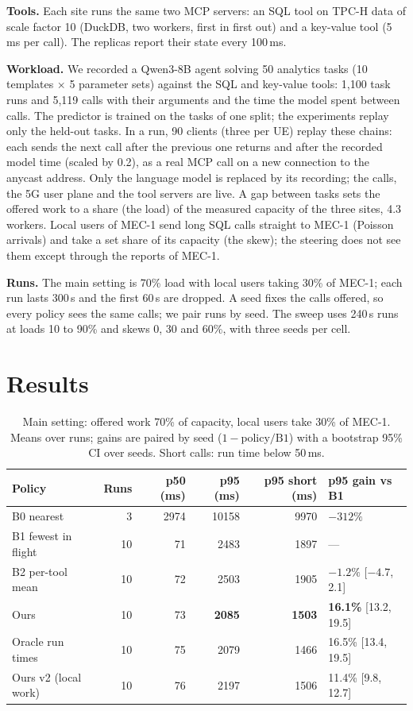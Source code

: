 \documentclass{article}
\begin{document}
\textbf{Tools.} Each site runs the same two MCP servers: an SQL tool on TPC-H data of scale
factor 10 (DuckDB, two workers, first in first out) and a key-value tool (5\,ms per call).
The replicas report their state every 100\,ms.

\textbf{Workload.} We recorded a Qwen3-8B agent solving 50 analytics tasks (10 templates
$\times$ 5 parameter sets) against the SQL and key-value tools: 1,100 task runs and 5,119
calls with their arguments and the time the model spent between calls. The predictor is
trained on the tasks of one split; the experiments replay only the held-out tasks. In a
run, 90 clients (three per UE) replay these chains: each sends the next call after the
previous one returns and after the recorded model time (scaled by 0.2), as a real MCP call
on a new connection to the anycast address. Only the language model is replaced by its
recording; the calls, the 5G user plane and the tool servers are live. A gap between tasks
sets the offered work to a share (the load) of the measured capacity of the three sites,
4.3 workers. Local users of MEC-1 send long SQL calls straight to MEC-1 (Poisson arrivals)
and take a set share of its capacity (the skew); the steering does not see them except
through the reports of MEC-1.

\textbf{Runs.} The main setting is 70\% load with local users taking 30\% of MEC-1; each
run lasts 300\,s and the first 60\,s are dropped. A seed fixes the calls offered, so every
policy sees the same calls; we pair runs by seed. The sweep uses 240\,s runs at loads 10 to
90\% and skews 0, 30 and 60\%, with three seeds per cell.

\section{Results}
\label{sec:results}

\begin{table}[t]
\centering
\caption{Main setting: offered work 70\% of capacity, local users take 30\% of MEC-1.
Means over runs; gains are paired by seed ($1-\text{policy}/\text{B1}$) with a bootstrap
95\% CI over seeds. Short calls: run time below 50\,ms.}
\label{tab:main}
\small
\begin{tabular}{lrrrrl}
\toprule
Policy & Runs & p50 (ms) & p95 (ms) & p95 short (ms) & p95 gain vs B1 \\
\midrule
B0 nearest & 3 & 2974 & 10158 & 9970 & $-312\%$ \\
B1 fewest in flight & 10 & 71 & 2483 & 1897 & --- \\
B2 per-tool mean & 10 & 72 & 2503 & 1905 & $-1.2\%$ [$-4.7$, 2.1] \\
Ours & 10 & 73 & \textbf{2085} & \textbf{1503} & \textbf{16.1\%} [13.2, 19.5] \\
Oracle run times & 10 & 75 & 2079 & 1466 & 16.5\% [13.4, 19.5] \\
Ours v2 (local work) & 10 & 76 & 2197 & 1506 & 11.4\% [9.8, 12.7] \\
\bottomrule
\end{tabular}
\end{table}
\end{document}
